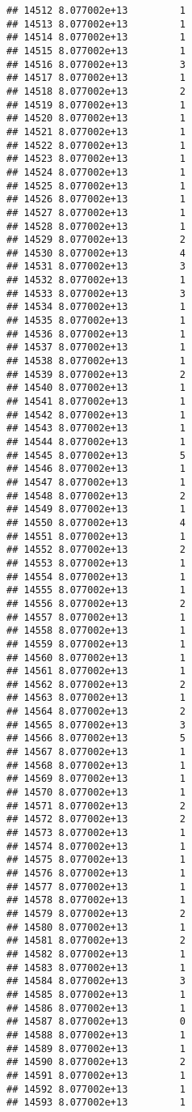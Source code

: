 \documentclass[
]{article}
\begin{document}
\begin{verbatim}
## 14512 8.077002e+13         1
## 14513 8.077002e+13         1
## 14514 8.077002e+13         1
## 14515 8.077002e+13         1
## 14516 8.077002e+13         3
## 14517 8.077002e+13         1
## 14518 8.077002e+13         2
## 14519 8.077002e+13         1
## 14520 8.077002e+13         1
## 14521 8.077002e+13         1
## 14522 8.077002e+13         1
## 14523 8.077002e+13         1
## 14524 8.077002e+13         1
## 14525 8.077002e+13         1
## 14526 8.077002e+13         1
## 14527 8.077002e+13         1
## 14528 8.077002e+13         1
## 14529 8.077002e+13         2
## 14530 8.077002e+13         4
## 14531 8.077002e+13         3
## 14532 8.077002e+13         1
## 14533 8.077002e+13         3
## 14534 8.077002e+13         1
## 14535 8.077002e+13         1
## 14536 8.077002e+13         1
## 14537 8.077002e+13         1
## 14538 8.077002e+13         1
## 14539 8.077002e+13         2
## 14540 8.077002e+13         1
## 14541 8.077002e+13         1
## 14542 8.077002e+13         1
## 14543 8.077002e+13         1
## 14544 8.077002e+13         1
## 14545 8.077002e+13         5
## 14546 8.077002e+13         1
## 14547 8.077002e+13         1
## 14548 8.077002e+13         2
## 14549 8.077002e+13         1
## 14550 8.077002e+13         4
## 14551 8.077002e+13         1
## 14552 8.077002e+13         2
## 14553 8.077002e+13         1
## 14554 8.077002e+13         1
## 14555 8.077002e+13         1
## 14556 8.077002e+13         2
## 14557 8.077002e+13         1
## 14558 8.077002e+13         1
## 14559 8.077002e+13         1
## 14560 8.077002e+13         1
## 14561 8.077002e+13         1
## 14562 8.077002e+13         2
## 14563 8.077002e+13         1
## 14564 8.077002e+13         2
## 14565 8.077002e+13         3
## 14566 8.077002e+13         5
## 14567 8.077002e+13         1
## 14568 8.077002e+13         1
## 14569 8.077002e+13         1
## 14570 8.077002e+13         1
## 14571 8.077002e+13         2
## 14572 8.077002e+13         2
## 14573 8.077002e+13         1
## 14574 8.077002e+13         1
## 14575 8.077002e+13         1
## 14576 8.077002e+13         1
## 14577 8.077002e+13         1
## 14578 8.077002e+13         1
## 14579 8.077002e+13         2
## 14580 8.077002e+13         1
## 14581 8.077002e+13         2
## 14582 8.077002e+13         1
## 14583 8.077002e+13         1
## 14584 8.077002e+13         3
## 14585 8.077002e+13         1
## 14586 8.077002e+13         1
## 14587 8.077002e+13         0
## 14588 8.077002e+13         1
## 14589 8.077002e+13         1
## 14590 8.077002e+13         2
## 14591 8.077002e+13         1
## 14592 8.077002e+13         1
## 14593 8.077002e+13         1

\end{verbatim}
\end{document}

